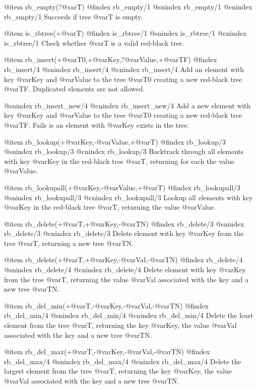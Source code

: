 @item rb_empty(?@var{T})
@findex rb_empty/1
@snindex rb_empty/1
@cnindex rb_empty/1
Succeeds if tree @var{T} is empty.

@item is_rbtree(+@var{T})
@findex is_rbtree/1
@snindex is_rbtree/1
@cnindex is_rbtree/1
Check whether @var{T} is a valid red-black tree.

@item rb_insert(+@var{T0},+@var{Key},?@var{Value},+@var{TF})
@findex rb_insert/4
@snindex rb_insert/4
@cnindex rb_insert/4
Add an element with key @var{Key} and @var{Value} to the tree
@var{T0} creating a new red-black tree @var{TF}. Duplicated elements are not
allowed.

@snindex rb_insert_new/4
@cnindex rb_insert_new/4
Add a new element with key @var{Key} and @var{Value} to the tree
@var{T0} creating a new red-black tree @var{TF}. Fails is an element
with @var{Key} exists in the tree.

@item rb_lookup(+@var{Key},-@var{Value},+@var{T})
@findex rb_lookup/3
@snindex rb_lookup/3
@cnindex rb_lookup/3
Backtrack through all elements with key @var{Key} in the red-black tree
@var{T}, returning for each the value @var{Value}.

@item rb_lookupall(+@var{Key},-@var{Value},+@var{T})
@findex rb_lookupall/3
@snindex rb_lookupall/3
@cnindex rb_lookupall/3
Lookup all elements with key @var{Key} in the red-black tree
@var{T}, returning the value @var{Value}.

@item rb_delete(+@var{T},+@var{Key},-@var{TN})
@findex rb_delete/3
@snindex rb_delete/3
@cnindex rb_delete/3
Delete element with key @var{Key} from the tree @var{T}, returning a new
tree @var{TN}.

@item rb_delete(+@var{T},+@var{Key},-@var{Val},-@var{TN})
@findex rb_delete/4
@snindex rb_delete/4
@cnindex rb_delete/4
Delete element with key @var{Key} from the tree @var{T}, returning the
value @var{Val} associated with the key and a new tree @var{TN}.

@item rb_del_min(+@var{T},-@var{Key},-@var{Val},-@var{TN})
@findex rb_del_min/4
@snindex rb_del_min/4
@cnindex rb_del_min/4
Delete the least element from the tree @var{T}, returning the key
@var{Key}, the value @var{Val} associated with the key and a new tree
@var{TN}.

@item rb_del_max(+@var{T},-@var{Key},-@var{Val},-@var{TN})
@findex rb_del_max/4
@snindex rb_del_max/4
@cnindex rb_del_max/4
Delete the largest element from the tree @var{T}, returning the key
@var{Key}, the value @var{Val} associated with the key and a new tree
@var{TN}.

